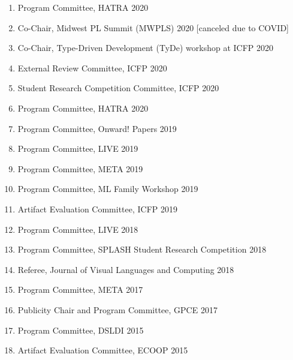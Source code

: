 \documentclass[10pt,letterpaper]{article}
\begin{document}
\begin{enumerate}
  \item Program Committee, HATRA 2020
  \item Co-Chair, Midwest PL Summit (MWPLS) 2020 [canceled due to COVID]
  \item Co-Chair, Type-Driven Development (TyDe) workshop at ICFP 2020
  \item External Review Committee, ICFP 2020
  \item Student Research Competition Committee, ICFP 2020
  \item Program Committee, HATRA 2020
  \item Program Committee, Onward! Papers 2019
  \item Program Committee, LIVE 2019
  \item Program Committee, META 2019
  \item Program Committee, ML Family Workshop 2019
  \item Artifact Evaluation Committee, ICFP 2019
  \item Program Committee, LIVE 2018
  \item Program Committee, SPLASH Student Research Competition 2018
  \item Referee, Journal of Visual Languages and Computing 2018
  \item Program Committee, META 2017
  \item Publicity Chair and Program Committee, GPCE 2017
  \item Program Committee, DSLDI 2015
  \item Artifact Evaluation Committee, ECOOP 2015
\end{enumerate}
\end{document}
